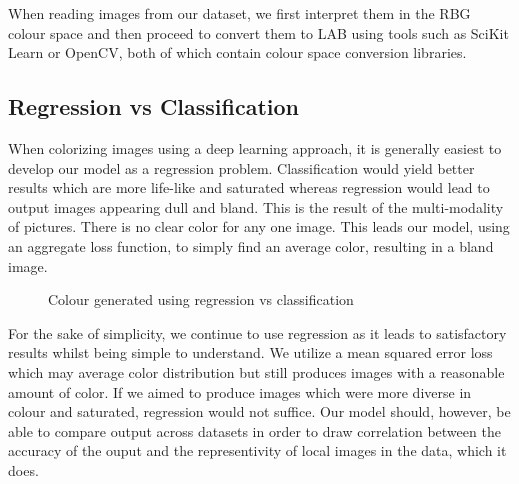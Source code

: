 \documentclass[conference]{IEEEtran}
\begin{document}
When reading images from our dataset, we first interpret them in the RBG colour space and then proceed to convert them to LAB using tools such as SciKit Learn or OpenCV, both of which contain colour space conversion libraries. 

\subsection{Regression vs Classification}

When colorizing images using a deep learning approach, it is generally easiest to develop our model as a regression problem. Classification would yield better results which are more life-like and saturated whereas regression would lead to output images appearing dull and bland. This is the result of the multi-modality of pictures. There is no clear color for any one image. This leads our model, using an aggregate loss function, to simply find an average color, resulting in a bland image.

\begin{figure}[h!]
    \centering
    \qquad
    \caption{Colour generated using regression vs classification \cite{zhang2016colorful}}%
    \label{fig:reg_vs_class}
\end{figure}

For the sake of simplicity, we continue to use regression as it leads to satisfactory results whilst being simple to understand. We utilize a mean squared error loss which may average color distribution but still produces images with a reasonable amount of color. If we aimed to produce images which were more diverse in colour and saturated, regression would not suffice. Our model should, however, be able to compare output across datasets in order to draw correlation between the accuracy of the ouput and the representivity of local images in the data, which it does.
\end{document}
